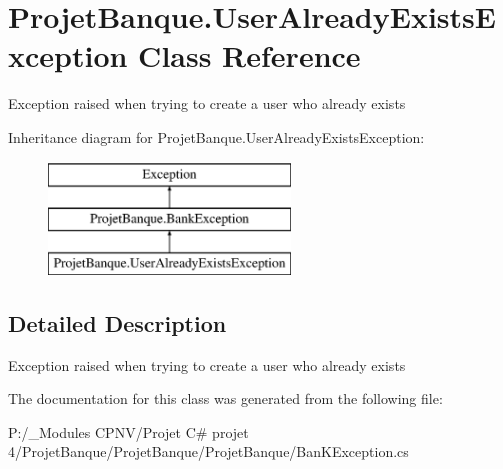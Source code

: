 \hypertarget{class_projet_banque_1_1_user_already_exists_exception}{}\section{Projet\+Banque.\+User\+Already\+Exists\+Exception Class Reference}
\label{class_projet_banque_1_1_user_already_exists_exception}


Exception raised when trying to create a user who already exists  


Inheritance diagram for Projet\+Banque.\+User\+Already\+Exists\+Exception\+:\begin{figure}[H]
\begin{center}
\leavevmode
\includegraphics[height=3.000000cm]{class_projet_banque_1_1_user_already_exists_exception}
\end{center}
\end{figure}


\subsection{Detailed Description}
Exception raised when trying to create a user who already exists 



The documentation for this class was generated from the following file\+:\begin{DoxyCompactItemize}
\item 
P\+:/\+\_\+\+Modules C\+P\+N\+V/\+Projet C\# projet 4/\+Projet\+Banque/\+Projet\+Banque/\+Projet\+Banque/Ban\+K\+Exception.\+cs\end{DoxyCompactItemize}

